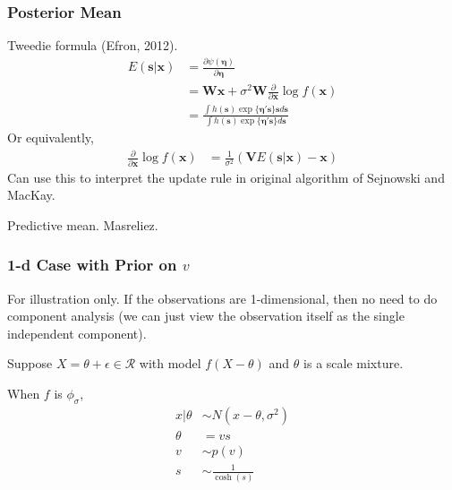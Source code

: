 \documentclass{beamer}
\begin{document}
\begin{frame}
\frametitle{Posterior Mean}
\footnotesize
Tweedie formula (Efron, 2012).  
\begin{align*}
E(\bm s | \bm x) &= \frac{\partial\psi(\bm\eta)}{\partial \bm\eta}\\
&= \bm{Wx} + \sigma^2\bm W\frac{\partial}{\partial \bm x}\log f(\bm x) \\
&= \frac{\int h(\bm s)\exp\{\bm{\eta's}\} \bm s d\bm s}{\int h(\bm s)\exp\{\bm{\eta's}\} d\bm s}
\end{align*}
Or equivalently, 
\begin{align*}
\frac{\partial}{\partial \bm x}\log f(\bm x) &= \frac{1}{\sigma^2}\left(\bm{V} E(\bm s | \bm x) - \bm x\right)
\end{align*}
Can use this to interpret the update rule in original algorithm of  Sejnowski and MacKay. 

\vspace{0.1in} 

Predictive mean.   Masreliez.
\end{frame}


\begin{frame}
\frametitle{1-d Case with Prior on $v$}
\footnotesize

For illustration only. If the observations are 1-dimensional, then no need to do component analysis (we can just view the observation itself as the single independent component).

\vspace{0.2in}

Suppose $X=\theta + \epsilon \in\mathcal{R}$ with model $f(X-\theta)$ and $\theta$ is a scale mixture. 

When $f$ is $\phi_\sigma$, 
\begin{align*}
x|\theta &\sim N(x-\theta, \sigma^2)\\
\theta &= vs\\
v &\sim p(v)\\
s &\sim \frac{1}{\cosh(s)}
\end{align*}
\end{frame}
\end{document}
